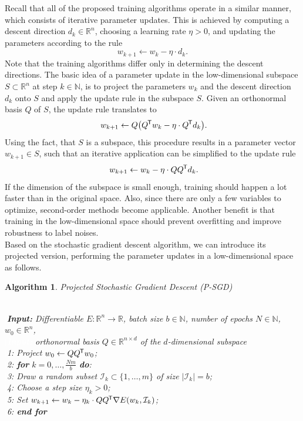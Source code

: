 \documentclass[11pt, a4paper]{article}
\newtheorem{algorithm}[theorem]{Algorithm}
\newcommand{\N}{\mathbb{N}}
\newcommand{\R}{\mathbb{R}}
\newcommand{\I}{\mathcal{I}}
\newcommand*{\tr}{^{\mkern-1.5mu\mathsf{T}}}
\begin{document}
Recall that all of the proposed training algorithms operate in a similar manner, which consists of iterative parameter updates. This is achieved by computing a descent direction $d_k \in \R^n$, choosing a learning rate $\eta > 0$, and updating the parameters according to the rule
\[ w_{k+1} \leftarrow w_k - \eta \cdot d_k. \]
Note that the training algorithms differ only in determining the descent directions. The basic idea of a parameter update in the  low-dimensional subspace $S \subset \R^n$ at step $k \in \N$, is to project the parameters $w_k$ and the descent direction $d_k$ onto $S$ and apply the update rule in the subspace $S$. Given an orthonormal basis $Q$ of $S$, the update rule translates to
\[ w_{k+1} \leftarrow Q \big ( Q \tr w_k - \eta \cdot Q \tr d_k \big ). \]
Using the fact, that $S$ is a subspace, this procedure results in a parameter vector $w_{k+1} \in S$, such that an iterative application can be simplified to the update rule
\[ w_{k+1} \leftarrow w_k - \eta \cdot Q Q \tr d_k. \]
If the dimension of the subspace is small enough, training should happen a lot faster than in the original space. Also, since there are only a few variables to optimize, second-order methods become applicable. Another benefit is that training in the low-dimensional space should prevent overfitting and improve robustness to label noises. \\

Based on the stochastic gradient descent algorithm, we can introduce its projected version, performing the parameter updates in a low-dimensional space as follows.

\begin{algorithm}
\caption{Projected Stochastic Gradient Descent (P-SGD) \textcolor{white}{$\Big |$}} \ \\
\textcolor{white}{$\Big |$}\textbf{Input:} Differentiable $E: \R^n \to \R$, batch size $b \in \N$, number of epochs $N \in \N$, $w_0 \in \R^n$, \\
\textcolor{white}{$\Big |$\textbf{Input:}} orthonormal basis $Q \in \R^{n \times d}$ of the $d$-dimensional subspace \\
\textcolor{white}{$\Big |$}1: Project $w_0 \leftarrow QQ\tr w_0$; \\
\textcolor{white}{$\Big |$}2: \textbf{for} $k=0, \dots, \frac{Nm}{b}$ \textbf{do}: \\
\textcolor{white}{$\Big |$}3: \quad Draw a random subset $\I_k \subset \{1, \dots, m \}$ of size $| \I_k | = b$; \\
\textcolor{white}{$\Big |$}4: \quad Choose a step size $\eta_k > 0$; \\
\textcolor{white}{$\Big |$}5: \quad Set $w_{k+1} \leftarrow  w_k - \eta_k \cdot QQ\tr \nabla E(w_k,\I_k)$; \\
\textcolor{white}{$\Big |$}6: \textbf{end for}
\end{algorithm}
\end{document}

